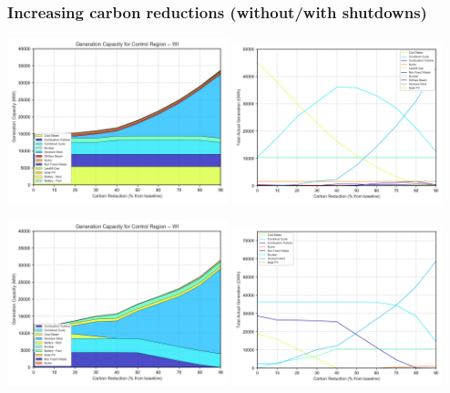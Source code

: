 \documentclass[xcolor=dvipsnames]{beamer}
\begin{document}
\begin{frame}
  \frametitle{Increasing carbon reductions (without/with shutdowns)}


  \includegraphics[width=0.48\textwidth]{includes/no_leakage_no_shutdowns_agg_capacity_cntlreg.png}
  \includegraphics[width=0.46\textwidth]{includes/no_leakage_no_shutdowns_agg_generation_cntlreg.png}

  \includegraphics[width=0.48\textwidth]{includes/no_leakage_shutdowns_agg_capacity_cntlreg.png}
  \includegraphics[width=0.46\textwidth]{includes/no_leakage_shutdowns_agg_generation_cntlreg.png}


\end{frame}
\end{document}
